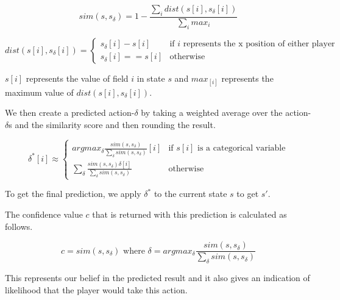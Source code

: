 $$sim(s, s_{\delta}) = 1-\frac{\sum_i dist(s[i], s_{\delta}[i])}{\sum_i max_i}$$

$$dist(s[i], s_{\delta}[i]) =
\begin{cases}
s_{\delta}[i] - s[i] & \text{if $i$ represents the x position of either player} \\
s_{\delta}[i] == s[i] & \text{otherwise}
\end{cases}
$$

$s[i]$ represents the value of field $i$ in state $s$ and $max_[i]$ represents the maximum value of $dist(s[i], s_{\delta}[i])$. 

We then create a predicted action-$\delta$ by taking a weighted average over the action-$\delta$s and the similarity score and then rounding the result.

$$\delta^*[i] \approx
\begin{cases}
argmax_\delta \frac{sim(s, s_{\delta})}{\sum_\delta sim(s, s_{\delta})}[i] & \text{if $s[i]$ is a categorical variable} \\
\sum_\delta \frac{sim(s, s_{\delta}) \delta[i] }{\sum_\delta sim(s, s_{\delta})} & \text{otherwise}
\end{cases}
$$

To get the final prediction, we apply $\delta^*$ to the current state $s$ to get $s'$.

The confidence value $c$ that is returned with this prediction is calculated as follows.

$$c = sim(s, s_{\delta}) \text{ where } \delta = argmax_\delta \frac{sim(s, s_{\delta})}{\sum_\delta sim(s, s_{\delta})}$$

This represents our belief in the predicted result and it also gives an indication of likelihood that the player would take this action.



